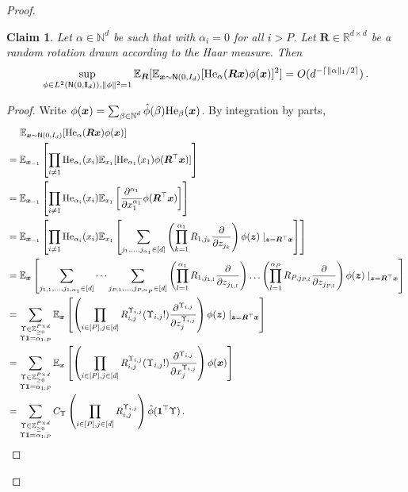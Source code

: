 \documentclass[11pt]{article}
\newcommand{\E}{\mathbb{E}}
\newcommand{\Z}{\mathbb{Z}}
\newcommand{\R}{\mathbb{R}}
\newcommand{\N}{\mathbb{N}}
\def\id{{\mathbf I}}
\newcommand{\<}{\langle}
\renewcommand{\>}{\rangle}
\newtheorem{claim}{Claim}
\theoremstyle{definition}
\def\bR{{\boldsymbol R}}
\def\bx{{\boldsymbol x}}
\def\bz{{\boldsymbol z}}
\def\normal{{\sf N}}
\def\normal{{\sf N}}
\def\normal{{\sf N}}
\def\bz{{\boldsymbol z}}
\def\He{{\rm He}}
\def\bx{{\boldsymbol x}}
\def\bz{{\boldsymbol z}}
\def\He{{\rm He}}
\def\normal{{\sf N}}
\def\bR{{\boldsymbol R}}
\def\bones{{\boldsymbol 1}}
\DeclarePairedDelimiter{\ceil}{\lceil}{\rceil}
\begin{document}
\begin{proof}
\begin{claim}
Let $\alpha \in \N^d$ be such that with $\alpha_{i} = 0$ for all $i > P$. Let $\bR \in \R^{d \times d}$ be a random rotation drawn according to the Haar measure. Then
$$\sup_{\phi \in L^2(\normal (0,\id_d)), \|\phi\|^2 = 1} \E_{\bR}[\E_{\bx \sim \normal(0,I_d)}[\He_{\alpha}(\bR \bx)\phi(\bx)]^2] = O(d^{-\ceil{\|\alpha\|_1/2}})\,.$$
\end{claim}
\begin{proof}
Write $\phi(\bx) = \sum_{\substack{\beta \in \N^d}} \hat{\phi}(\beta) \He_{\beta}(\bx)$. By integration by parts,
\allowdisplaybreaks
\begin{align*}
&\;\;\;\;\;\E_{\bx \sim \normal(0,I_d)}[\He_{\alpha}(\bR\bx) \phi(\bx)] \\
&=  \E_{\bx_{-1}}\left[\prod_{i \neq 1} \He_{\alpha_i}(x_i)\E_{x_1}[\He_{\alpha_1}(x_1) \phi(\bR^{\top}\bx)]\right] \\
&= \E_{\bx_{-1}} \left[ \prod_{i \neq 1} \He_{\alpha_i}(x_i) \E_{x_1}\left[ \frac{\partial^{\alpha_1}}{\partial x_1^{\alpha_1}} \phi(\bR^{\top} \bx)\right]\right] \\
&= \E_{\bx_{-1}}\left[\prod_{i \neq 1} \He_{\alpha_i}(x_i) \E_{x_1}\left[\sum_{j_1,\ldots,j_{\alpha_1} \in [d]} \left( \prod_{k=1}^{\alpha_1} R_{1,j_k} \frac{\partial}{\partial z_{j_k}} \right) \phi(\bz) \mid_{\bz = \bR^{\top} \bx}\right]\right] \\
&= \E_{\bx}\left[\sum_{j_{1,1},\ldots,j_{1,\alpha_1} \in [d]} \dots \sum_{j_{P,1},\ldots,j_{P,\alpha_P} \in [d]} \left(\prod_{l=1}^{\alpha_1} R_{1,j_{1,l}} \frac{\partial}{\partial z_{j_{1,l}}}\right) \dots \left(\prod_{l=1}^{\alpha_P} R_{P,j_{P,l}} \frac{\partial}{\partial z_{j_{P,l}}}\right) \phi(\bz) \mid_{\bz = \bR^{\top} \bx}\right] \\
&= \sum_{\substack{\Upsilon \in \Z_{\geq 0}^{P \times d} \\ 
\Upsilon \bones = \alpha_{1:P}}}  \E_{\bx}\left[\left(\prod_{i \in [P],j \in [d]} R_{i,j}^{\Upsilon_{i,j}} (\Upsilon_{i,j}!) \frac{\partial^{\Upsilon_{i,j}}}{{\partial z_{j}^{\Upsilon_{i,j}}}}\right) \phi(\bz) \mid_{\bz = \bR^{\top} \bx}\right] \\
&= \sum_{\substack{\Upsilon \in \Z_{\geq 0}^{P \times d} \\ 
\Upsilon \bones = \alpha_{1:P}}} 
\E_{\bx}\left[\left(\prod_{i \in [P],j \in [d]} R_{i,j}^{\Upsilon_{i,j}} (\Upsilon_{i,j}!) \frac{\partial^{\Upsilon_{i,j}}}{{\partial x_{j}^{\Upsilon_{i,j}}}} \right) \phi(\bx)\right] \\
&= \sum_{\substack{\Upsilon \in \Z_{\geq 0}^{P \times d} \\ 
\Upsilon \bones = \alpha_{1:P}}}  C_{\Upsilon} \left(\prod_{i \in [P],j \in [d]} R_{i,j}^{\Upsilon_{i,j}} \right) \hat{\phi}(\bones^{\top} \Upsilon)\,.
\end{align*}


\end{proof}
\end{proof}
\end{document}
